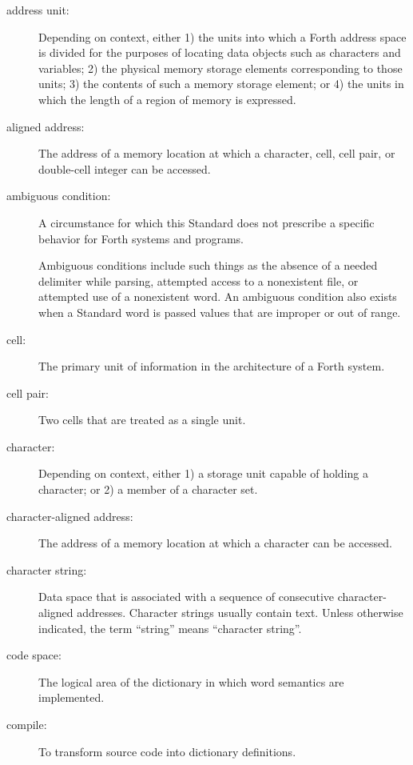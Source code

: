 \begin{description}
\item[address unit:]
Depending on context, either
1) the units into which a Forth address space is divided for the
	purposes of locating data objects such as characters and variables;
2) the physical memory storage elements corresponding to those units;
3) the contents of such a memory storage element; or
4) the units in which the length of a region of memory is expressed.

\item[aligned address:]
	The address of a memory location at which a character, cell, cell
	pair, or double-cell integer can be accessed.

\item[ambiguous condition:]
	A circumstance for which this Standard does not prescribe a
	specific behavior for Forth systems and programs.

	Ambiguous conditions include such things as the absence of a needed
	delimiter while parsing, attempted access to a nonexistent file, or
	attempted use of a nonexistent word. An ambiguous condition also
	exists when a Standard word is passed values that are improper or
	out of range.

\item[cell:]
	The primary unit of information in the architecture of a Forth
	system.

\item[cell pair:]
	Two cells that are treated as a single unit.

\item[character:]
	Depending on context, either
	1) a storage unit capable of holding a character; or
	2) a member of a character set.

\item[character-aligned address:]
	The address of a memory location at which a character can be
	accessed.

\item[character string:]
	Data space that is associated with a sequence of consecutive
	character-aligned addresses. Character strings usually contain
	text. Unless otherwise indicated, the term ``string'' means
	``character string''.

\item[code space:]
	The logical area of the dictionary in which word semantics are
	implemented.

\item[compile:]
	To transform source code into dictionary definitions.


\end{description}
